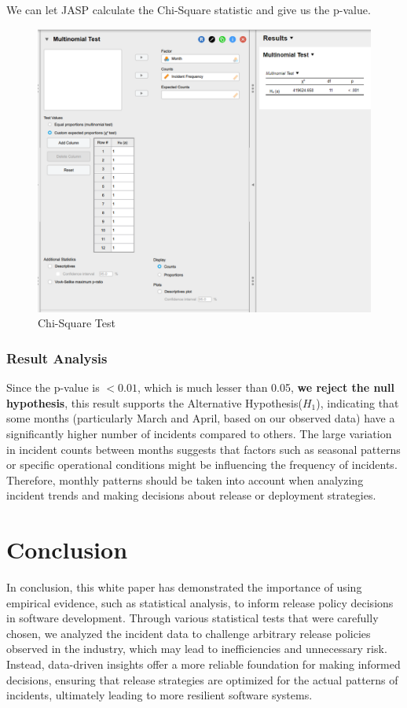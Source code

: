 \documentclass{article}
\begin{document}
We can let JASP calculate the Chi-Square statistic and give us the p-value.

\begin{figure} [H]
    \centering
    \includegraphics[width=0.5\linewidth]{resources/Screenshot 2024-10-20 170522.png}
    \caption{Chi-Square Test}
    \label{fig:enter-label}
\end{figure}

\subsubsection{Result Analysis}

Since the p-value is $< 0.01$, which is much lesser than 0.05, \textbf{we reject the null hypothesis}, this result supports the Alternative Hypothesis($H_1$), indicating that some months (particularly March and April, based on our observed data) have a significantly higher number of incidents compared to others. The large variation in incident counts between months suggests that factors such as seasonal patterns or specific operational conditions might be influencing the frequency of incidents. Therefore, monthly patterns should be taken into account when analyzing incident trends and making decisions about release or deployment strategies.

\section{Conclusion}

In conclusion, this white paper has demonstrated the importance of using empirical evidence, such as statistical analysis, to inform release policy decisions in software development. Through various statistical tests that were carefully chosen, we analyzed the incident data to challenge arbitrary release policies observed in the industry, which may lead to inefficiencies and unnecessary risk. Instead, data-driven insights offer a more reliable foundation for making informed decisions, ensuring that release strategies are optimized for the actual patterns of incidents, ultimately leading to more resilient software systems.
\end{document}
